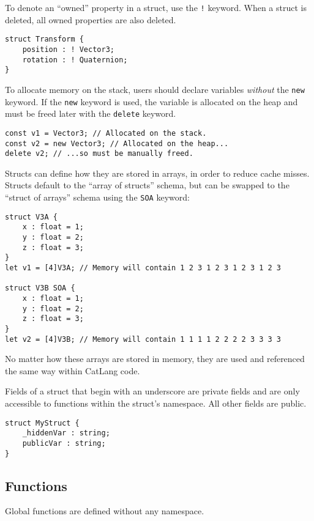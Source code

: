 \documentclass[12pt]{article}
\begin{document}
To denote an ``owned'' property in a struct, use the \lstinline$!$ keyword. When a struct is deleted, all owned properties are also deleted.

\begin{lstlisting}
struct Transform {
	position : ! Vector3;
	rotation : ! Quaternion;
}
\end{lstlisting}

To allocate memory on the stack, users should declare variables \emph{without} the \lstinline!new! keyword. If the \lstinline!new! keyword is used, the variable is allocated on the heap and must be freed later with the \lstinline!delete! keyword.

\begin{lstlisting}
const v1 = Vector3; // Allocated on the stack.
const v2 = new Vector3; // Allocated on the heap...
delete v2; // ...so must be manually freed.
\end{lstlisting}

Structs can define how they are stored in arrays, in order to reduce cache misses. Structs default to the ``array of structs'' schema, but can be swapped to the ``struct of arrays'' schema using the \lstinline!SOA! keyword:

\begin{lstlisting}
struct V3A {
	x : float = 1;
	y : float = 2;
	z : float = 3;
}
let v1 = [4]V3A; // Memory will contain 1 2 3 1 2 3 1 2 3 1 2 3

struct V3B SOA {
	x : float = 1;
	y : float = 2;
	z : float = 3;
}
let v2 = [4]V3B; // Memory will contain 1 1 1 1 2 2 2 2 3 3 3 3
\end{lstlisting}

No matter how these arrays are stored in memory, they are used and referenced the same way within CatLang code.

Fields of a struct that begin with an underscore are private fields and are only accessible to functions within the struct's namespace. All other fields are public.

\begin{lstlisting}
struct MyStruct {
	_hiddenVar : string;
	publicVar : string;
}
\end{lstlisting}

\subsection{Functions}

Global functions are defined without any namespace.
\end{document}
